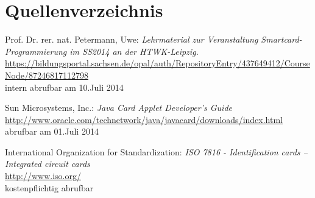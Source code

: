 \documentclass[a4paper,12pt]{scrartcl}
\begin{document}
\clearpage
\section{Quellenverzeichnis}
\label{sec:6}
\renewcommand\refname{Quellenverzeichnis}
\begin{thebibliography}{999}

Prof. Dr. rer. nat. Petermann, Uwe: {\sl Lehrmaterial zur Veranstaltung Smartcard-Programmierung im SS2014 an der HTWK-Leipzig.}\\
\url{https://bildungsportal.sachsen.de/opal/auth/RepositoryEntry/437649412/CourseNode/87246817112798}\\
intern abrufbar am 10.Juli 2014

Sun Microsystems, Inc.:  {\sl Java Card Applet Developer's Guide}\\
\url{http://www.oracle.com/technetwork/java/javacard/downloads/index.html}\\
abrufbar am 01.Juli 2014

International Organization for Standardization: {\sl ISO 7816 - Identification cards -- Integrated circuit cards}\\
\url{http://www.iso.org/}\\
kostenpflichtig abrufbar 

\end{thebibliography}
\end{document}
